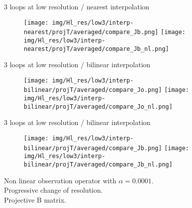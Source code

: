 \documentclass[francais]{beamer}
\begin{document}
\begin{frame}{3 loops at low resolution / nearest interpolation}
\begin{center}
\begin{figure}
  \texttt{[image: img/Hl\_res/low3/interp-nearest/projT/averaged/compare\_Jb.png]}
\endminipage\hfill
{}
  \texttt{[image: img/Hl\_res/low3/interp-nearest/projT/averaged/compare\_Jb\_nl.png]}
\endminipage
\end{figure}
\end{center}
\end{frame}

\begin{frame}{3 loops at low resolution / bilinear interpolation}
\begin{center}
\begin{figure}
  \texttt{[image: img/Hl\_res/low3/interp-bilinear/projT/averaged/compare\_Jo.png]}
\endminipage\hfill
{}
  \texttt{[image: img/Hl\_res/low3/interp-bilinear/projT/averaged/compare\_Jo\_nl.png]}
\endminipage
\end{figure}
\end{center}
\end{frame}

\begin{frame}{3 loops at low resolution / bilinear interpolation}
\begin{center}
\begin{figure}
  \texttt{[image: img/Hl\_res/low3/interp-bilinear/projT/averaged/compare\_Jb.png]}
\endminipage\hfill
{}
  \texttt{[image: img/Hl\_res/low3/interp-bilinear/projT/averaged/compare\_Jb\_nl.png]}
\endminipage
\end{figure}
\end{center}
\end{frame}


\begin{frame}
\begin{center}
Non linear observation operator with $\alpha=0.0001$.\\
Progressive change of resolution.\\
Projective B matrix.
\end{center}
\end{frame}
\end{document}
